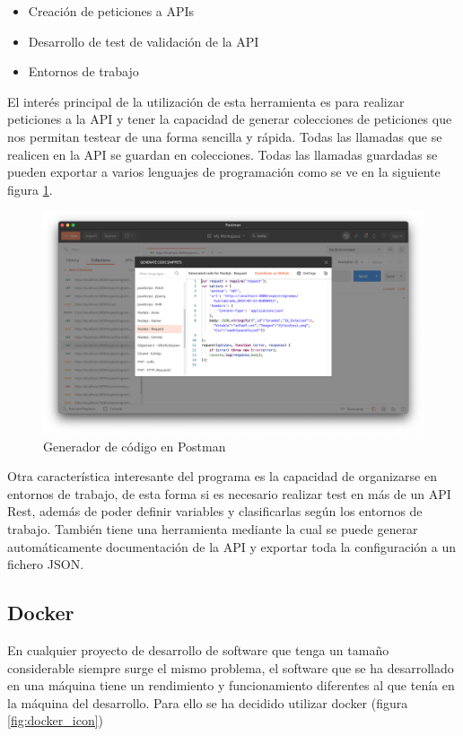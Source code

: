 \begin{itemize}
    \item Creación de peticiones a APIs
    \item Desarrollo de test de validación de la API
    \item Entornos de trabajo
\end{itemize}

El interés principal de la utilización de esta herramienta es para realizar peticiones a la API y tener la capacidad de generar colecciones de peticiones que nos permitan testear de una forma sencilla y rápida.
Todas las llamadas que se realicen en la API se guardan en colecciones. Todas las llamadas guardadas se pueden exportar a varios lenguajes de programación como se ve en la siguiente figura \ref{fig:postman_snippet}.

\begin{figure}[H]
    \centering
    \includegraphics[width=\textwidth]{include/capturas/PostmanSnippet.png}
    \caption{Generador de código en Postman}
    \label{fig:postman_snippet}
\end{figure}

Otra característica interesante del programa es la capacidad de organizarse en entornos de trabajo, de esta forma si es necesario realizar test en más de un API Rest, además de poder definir variables y clasificarlas según los entornos de trabajo. También tiene una herramienta mediante la cual se puede generar automáticamente documentación de la API y exportar toda la configuración a un fichero JSON.


\subsection{Docker}

En cualquier proyecto de desarrollo de software que tenga un tamaño considerable siempre surge el mismo problema, el software que se ha desarrollado en una máquina tiene un rendimiento y funcionamiento diferentes al que tenía en la máquina del desarrollo. Para ello se ha decidido utilizar docker (figura \ref{fig:docker_icon})

